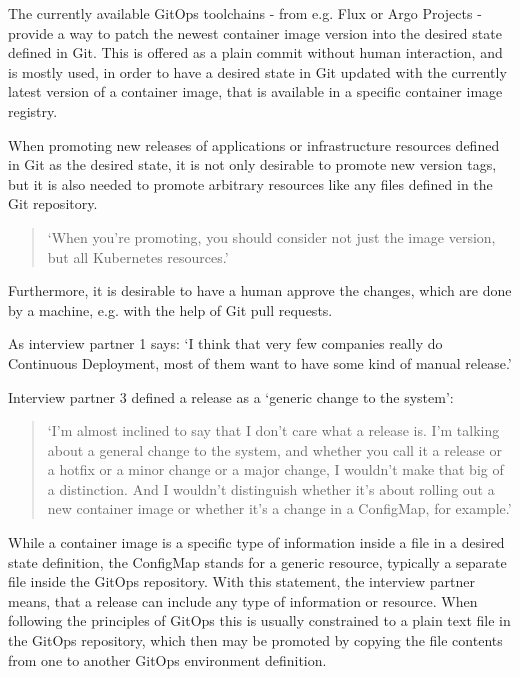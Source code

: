 The currently available GitOps toolchains -
from e.g. Flux or Argo Projects -
provide a way to patch the newest container image version
into the desired state defined in Git.
This is offered as a plain commit without human interaction,
and is mostly used, in order to have a desired state in Git updated with
the currently latest version of a container image,
that is available in a specific container image registry.

When promoting new releases of applications or infrastructure resources defined in Git as the 
desired state, it is not only desirable to promote new version tags,
but it is also needed to promote arbitrary resources like any files
defined in the Git repository.

\begin{quotation}
	\noindent
	\enquote*{When you're promoting, you should consider not just the image version, but all Kubernetes resources.}
\end{quotation}

Furthermore, it is desirable to have a human approve the changes,
which are done by a machine, e.g. with the help of Git pull requests.

As interview partner 1 says:
\enquote*{I think that very few companies really do Continuous Deployment, most of them want to have some kind of manual release.}

Interview partner 3 defined a release
as a \enquote*{generic change to the system}:

\begin{quotation}
	\noindent
	\enquote*{I'm almost inclined to say that I don't care what a release is. I'm talking about a general change to the system, and whether you call it a release or a hotfix or a minor change or a major change, I wouldn't make that big of a distinction. And I wouldn't distinguish whether it's about rolling out a new container image or whether it's a change in a ConfigMap, for example.}
\end{quotation}

While a container image is a specific type of information inside a file in a desired state definition,
the ConfigMap stands for a generic resource, typically a separate file inside the GitOps repository.
With this statement, the interview partner means, that a release can include any type of information
or resource. When following the principles of GitOps this is usually constrained to a plain text
file in the GitOps repository, which then may be promoted by copying the file contents from
one to another GitOps environment definition.

